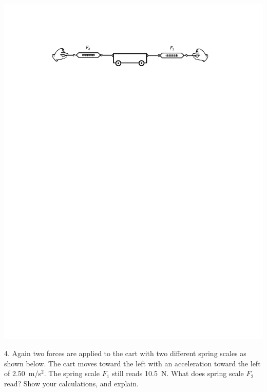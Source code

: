 \includegraphics{force_mass/cart_plus_two_scales.pdf}

\answerspace{30mm}

4. Again two forces are applied to the cart with two different spring scales
as shown below. The cart moves toward the left with an acceleration toward the left of 2.50~m/s$^2$. 
The spring scale \( F_{1} \) still reads 10.5~N.
What does spring scale \( F_{2} \) read? Show your calculations, and
explain.

